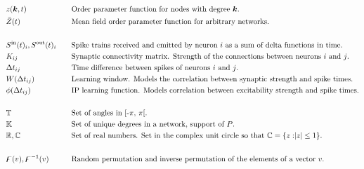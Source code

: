 \begin{alignat*}{2}
& z({\boldsymbol{k}}, t) &&\text{Order parameter function for nodes with degree ${\boldsymbol{k}}$.}\\
& \bar{Z}(t) &&\text{Mean field order parameter function for arbitrary networks.}\\ \\
& {S^{\rm in}}(t)_i, {S^{\rm out}}(t)_i \quad &&\text{Spike trains received and emitted by neuron $i$ as a sum of delta functions in time.}\\ 
& K_{ij} &&\text{Synaptic connectivity matrix. Strength of the connections between neurons $i$ and $j$.}\\
& \Delta t_{ij} &&\text{Time difference between spikes of neurons $i$ and $j$.}\\
& W(\Delta t_{ij}) &&\text{Learning window. Models the correlation between synaptic strength and spike times.}\\ 
& \phi(\Delta t_{ij}) &&\text{IP learning function. Models correlation between excitability strength and spike times.}\\ \\
& {\mathbb{T}} &&\text{Set of angles in [-$\pi$, $\pi$[.}\\
& {\mathbb{K}} &&\text{Set of unique degrees in a network, support of $P$.}\\ 
& {\mathbb{R}}, {\mathbb{C}} &&\text{Set of real numbers. Set in the complex unit circle so that ${\mathbb{C}} = \{ z: \rvert z \rvert \leq 1 \} $.}\\ \\
& {\digamma}(v), {\digamma^{-1}}(v) &&\text{Random permutation and inverse permutation of the elements of a vector $v$.}\\ 
\end{alignat*}
